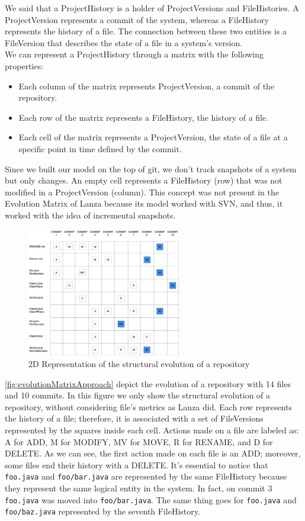We said that a ProjectHistory is a holder of ProjectVersions and FileHistories. 
A ProjectVersion represents a commit of the system, whereas a FileHistory represents the history of a file. 
The connection between these two entities is a FileVersion that describes the state of a file in a system's version. \\
We can represent a ProjectHistory through a matrix with the following properties: 
\begin{itemize}
    \item Each column of the matrix represents ProjectVersion, a commit of the repository. 
    \item Each row of the matrix represents a FileHistory, the history of a file. 
    \item Each cell of the matrix represents a ProjectVersion, the state of a file at a specific point in time defined by the commit. 
\end{itemize}

Since we built our model on the top of git, we don't track snapshots of a system but only changes. 
An empty cell represents a FileHistory (row) that was not modified in a ProjectVersion (column). 
This concept was not present in the Evolution Matrix of Lanza because its model worked with SVN, and thus, it worked with the idea of incremental snapshots.  

\begin{figure}
    \center
    \includegraphics[width=0.6\textwidth]{2DMatrix.jpg}
    \caption{2D Representation of the structural evolution of a repository}
    \label{fig:evolutionMatrixApproach}
\end{figure}
\autoref{fig:evolutionMatrixApproach} depict the evolution of a repository with 14 files and 10 commits. In this figure we only show the structural evolution of a repository, without considering file's metrics as Lanza did. 
Each row represents the history of a file; therefore, it is associated with a set of FileVersions represented by the squares inside each cell. Actions made on a file are labeled as: A for ADD, M for MODIFY, MV for MOVE, R for RENAME, and D for DELETE.
As we can see, the first action made on each file is an ADD; moreover, some files end their history with a DELETE. It's essential to notice that \texttt{foo.java} and \texttt{foo/bar.java} are represented by the same FileHistory because they represent the same logical entity in the system. In fact, on commit 3 \texttt{foo.java} was moved into \texttt{foo/bar.java}. The same thing goes for \texttt{foo.java} and \texttt{foo/baz.java} represented by the seventh FileHistory.


